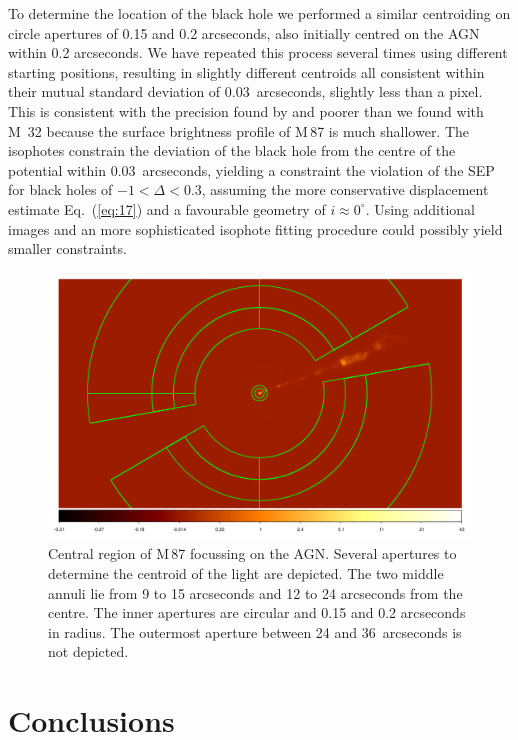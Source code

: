 \documentclass[useAMS,usenatbib]{mn2e}
\begin{document}
To determine the location of the black hole we performed a similar
centroiding on circle 
apertures
of 0.15 and 0.2 arcseconds, also
initially centred on the AGN within 0.2 arcseconds.  We have repeated
this process several times using different starting positions,
resulting in slightly different centroids all consistent within their
mutual standard deviation of 0.03~arcseconds, slightly less than a
pixel.  This is consistent with the precision found by
\cite{2013ApJ...770...86W} and poorer than we found with M~32 because
the surface brightness profile of M\,87 is much shallower.  The
isophotes constrain the deviation of the black hole from the centre of
the potential within 0.03~arcseconds, yielding a 
constraint 
the
violation of the SEP for black holes of $-1<\Delta<0.3$, assuming the
more conservative displacement estimate Eq.~(\ref{eq:17}) and a
favourable geometry of $i\approx 0^\circ$.  Using additional
images and an more sophisticated isophote fitting procedure could
possibly yield smaller constraints.
\begin{figure}
  \includegraphics[width=\columnwidth]{ds9.pdf}
  \caption{Central region of M\,87 focussing on the AGN.  Several
    apertures to determine the centroid of the light are depicted.
    The two middle annuli lie from 9 to 15 arcseconds and 12 to 24
    arcseconds from the centre.  The inner apertures are circular and
    0.15 and 0.2 arcseconds in radius. The outermost aperture between
    24 and 36~arcseconds is not depicted.}
  \label{fig:M87}
\end{figure}

\section{Conclusions}
\label{conclusions}
\end{document}

